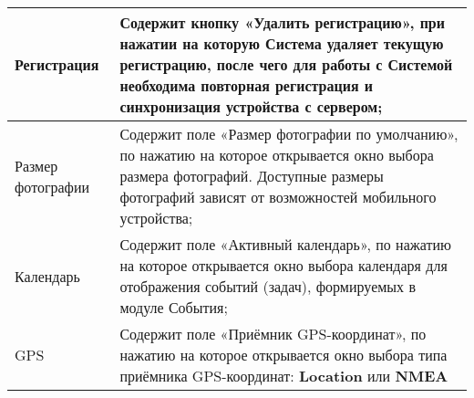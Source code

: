 \begin{enumerate}[\thesection .1]
\begin{longtable}{|p{5cm}|p{13cm}|}
Регистрация  & Содержит кнопку «Удалить регистрацию», при нажатии на которую Система удаляет текущую регистрацию, после чего для работы с Системой необходима повторная регистрация и синхронизация устройства с сервером; \\ \hline
Размер фотографии  & Содержит поле «Размер фотографии по умолчанию», по нажатию на которое открывается окно выбора размера фотографий. Доступные размеры фотографий зависят от возможностей мобильного устройства; \\ \hline
Календарь  & Содержит поле «Активный календарь», по нажатию на которое открывается окно выбора календаря для отображения событий (задач), формируемых в модуле События;  \\ \hline
GPS  & Содержит поле «Приёмник GPS-координат», по нажатию на которое открывается окно выбора типа приёмника GPS-координат: \textbf{Location} или \textbf{NMEA}  \\ \hline
\end{longtable} 
\end{enumerate}
